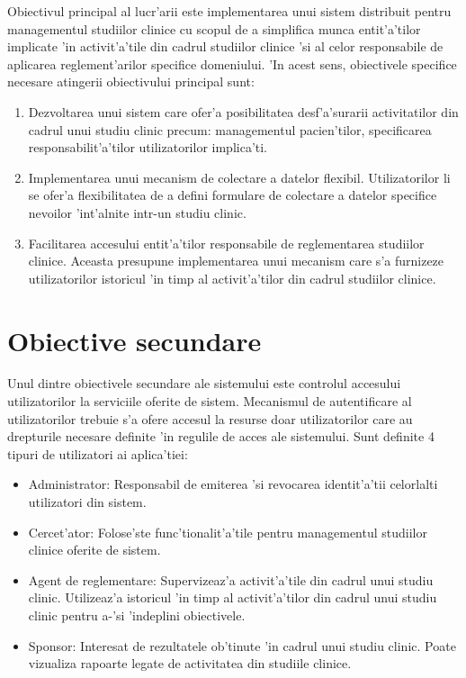 \documentclass[12pt,a4paper,twoside]{report}
\begin{document}
Obiectivul principal al lucr'arii este implementarea unui sistem distribuit pentru managementul studiilor clinice cu scopul de a simplifica munca entit'a'tilor implicate 'in activit'a'tile din cadrul studiilor clinice 'si al celor responsabile de aplicarea reglement'arilor specifice domeniului. 'In acest sens, obiectivele specifice necesare atingerii obiectivului principal sunt:
    \begin{enumerate}
        \item Dezvoltarea unui sistem care ofer'a posibilitatea desf'a'surarii activitatilor din cadrul unui studiu clinic precum: managementul pacien'tilor, specificarea responsabilit'a'tilor utilizatorilor implica'ti.
        \item Implementarea unui mecanism de colectare a datelor flexibil. Utilizatorilor li se ofer'a flexibilitatea de a defini formulare de colectare a datelor specifice nevoilor 'int'alnite intr-un studiu clinic.
        \item Facilitarea accesului entit'a'tilor responsabile de reglementarea studiilor clinice. Aceasta presupune implementarea unui mecanism care s'a furnizeze utilizatorilor istoricul 'in timp al activit'a'tilor din cadrul studiilor clinice.
    \end{enumerate}
    
\section{Obiective secundare}

    Unul dintre obiectivele secundare ale sistemului este controlul accesului utilizatorilor la serviciile oferite de sistem. Mecanismul de autentificare al utilizatorilor trebuie s'a ofere accesul la resurse doar utilizatorilor care au drepturile necesare definite 'in regulile de acces ale sistemului.
    Sunt definite 4 tipuri de utilizatori ai aplica'tiei:
    \begin{itemize}
        \item Administrator: Responsabil de emiterea 'si revocarea identit'a'tii celorlalti utilizatori din sistem. 
        \item Cercet'ator: Folose'ste func'tionalit'a'tile pentru managementul studiilor clinice oferite de sistem. 
        \item Agent de reglementare: Supervizeaz'a activit'a'tile din cadrul unui studiu clinic. Utilizeaz'a istoricul 'in timp al activit'a'tilor din cadrul unui studiu clinic pentru a-'si 'indeplini obiectivele.
        \item Sponsor: Interesat de rezultatele ob'tinute 'in cadrul unui studiu clinic. Poate vizualiza rapoarte legate de activitatea din studiile clinice.
    \end{itemize}
    
\end{document}
